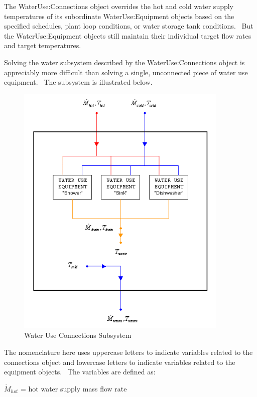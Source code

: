 The WaterUse:Connections object overrides the hot and cold water supply temperatures of its subordinate WaterUse:Equipment objects based on the specified schedules, plant loop conditions, or water storage tank conditions.~ But the WaterUse:Equipment objects still maintain their individual target flow rates and target temperatures.

Solving the water subsystem described by the WaterUse:Connections object is appreciably more difficult than solving a single, unconnected piece of water use equipment.~ The subsystem is illustrated below.

\begin{figure}[hbtp] %
\centering
\includegraphics[width=0.9\textwidth, height=0.9\textheight, keepaspectratio=true]{media/image7005.png}
\caption{Water Use Connections Subsystem \protect \label{fig:water-use-connections-subsystem}}
\end{figure}

The nomenclature here uses uppercase letters to indicate variables related to the connections object and lowercase letters to indicate variables related to the equipment objects.~ The variables are defined as:

\({\dot M_{hot}}\) = hot water supply mass flow rate

